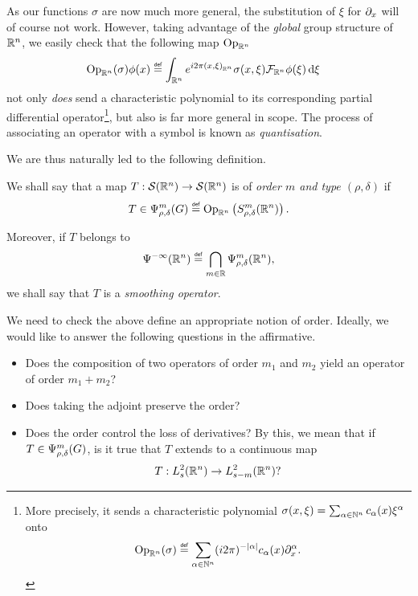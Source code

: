 As our functions $\sigma$ are now much more general,
the substitution of $\xi$ for $\iD x$ will of course not work.
However, taking advantage of the \emph{global} group structure of $\R^n$,
we easily check that the following map $\Op [\R^n]$
\begin{align}
    \Op [\R^n] (\sigma) \phi(x)
    &\defeq \int_{\R^n} \e^{\i \turn \ip [\R^n] x \xi} \sigma(x, \xi) \Fourier [\R^n] \phi(\xi) \dd \xi
    \label{eq:intro:Euclidean:quantisation}
\end{align}
not only \emph{does} send a characteristic polynomial to its corresponding partial differential operator\footnote{%
    More precisely,
    it sends a characteristic polynomial $\sigma(x, \xi) = \sum_{\alpha \in \N^n} c_\alpha(x) \xi^\alpha$ onto
    \begin{align*}
        \Op [\R^n](\sigma) \defeq \sum_{\alpha \in \N^n} (i \turn)^{-\abs \alpha} c_\alpha(x) \iD {x^\alpha}.
    \end{align*}
},
but also is far more general in scope.
The process of associating an operator with a symbol is known as \emph{quantisation}.

We are thus naturally led to the following definition.
\begin{definition}
    We shall say that a map $T : \Schwartz {\R^n} \to \Schwartz {\R^n}$ is of \emph{order $m$ and type $(\rho, \delta)$} if
    \begin{align*}
        T \in \OperatorClass m {\rho, \delta}
        \defeq \Op [\R^n] \left(\SymbolClass [\R^n] m {\rho, \delta}\right).
    \end{align*}

    Moreover,
    if $T$ belongs to
    \begin{align*}
        \SmoothingOperators [\R^n] \defeq \bigcap_{m \in \R} \OperatorClass [\R^n] m {\rho, \delta},
    \end{align*}
    we shall say that $T$ is a \emph{smoothing operator}.
\end{definition}

We need to check the above define an appropriate notion of order.
Ideally, we would like to answer the following questions in the affirmative.

\begin{itemize}
    \item Does the composition of two operators of order $m_1$ and $m_2$ yield an operator of order $m_1 + m_2$?
    \item Does taking the adjoint preserve the order?
    \item Does the order control the loss of derivatives?
        By this, we mean that if $T \in \OperatorClass m {\rho, \delta}$,
        is it true that $T$ extends to a continuous map
        \begin{align*}
            T : \Sobolev [\R^n] s \to \Sobolev [\R^n] {s - m}?
        \end{align*}
\end{itemize}

